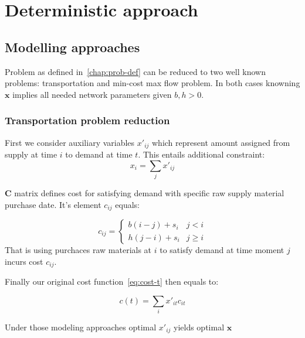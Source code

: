
\chapter{Deterministic approach}
\label{chap:Deterministic approach}

\section{Modelling approaches}

Problem as defined in~\ref{chap:prob-def} can be reduced to two well known problems: transportation and min-cost max flow problem. In both cases knowning $\mathbf{x}$ implies all needed network parameters given $b, h > 0$.

\subsection{Transportation problem reduction}
\label{subs:Transportation problem reduction}

First we consider auxiliary variables $x'_{ij}$ which represent amount assigned from supply at time $i$ to demand at time $t$. This entails additional constraint:
\[x_i = \sum_j{x'_{ij}}\]

\begin{definition}{$\mathbf{C}$}
matrix defines cost for satisfying demand with specific raw supply material purchase date. It's element $c_{ij}$ equals:

\begin{equation*}
    c_{ij} = \begin{cases}
        b \left( i - j \right) + s_i & j < i \\
        h \left( j - i \right) + s_i & j \ge i
    \end{cases}
\end{equation*}
That is using purchaces raw materials at $i$ to satisfy demand at time moment $j$ incurs cost $c_{ij}$.
\end{definition}

Finally our original cost function~\ref{eq:cost-t} then equals to:

\begin{equation}
    \label{eq:cost-trans-t}
    c(t) = \sum_i{x'_{it}c_{it}}
\end{equation}

Under those modeling approaches optimal $x'_{ij}$ yields optimal $\mathbf{x}$

